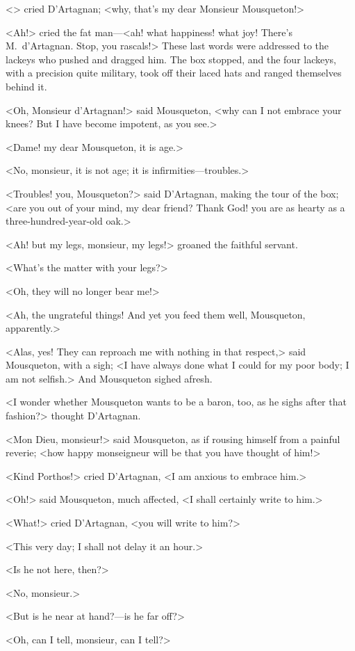 <> cried D'Artagnan; <why, that's my dear Monsieur Mousqueton!>

<Ah!> cried the fat man—<ah! what happiness! what joy! There's M.~d'Artagnan. Stop, you rascals!> These last words were addressed to the lackeys who pushed and dragged him. The box stopped, and the four lackeys, with a precision quite military, took off their laced hats and ranged themselves behind it.

<Oh, Monsieur d'Artagnan!> said Mousqueton, <why can I not embrace your knees? But I have become impotent, as you see.>

<Dame! my dear Mousqueton, it is age.>

<No, monsieur, it is not age; it is infirmities—troubles.>

<Troubles! you, Mousqueton?> said D'Artagnan, making the tour of the box; <are you out of your mind, my dear friend? Thank God! you are as hearty as a three-hundred-year-old oak.>

<Ah! but my legs, monsieur, my legs!> groaned the faithful servant.

<What's the matter with your legs?>

<Oh, they will no longer bear me!>

<Ah, the ungrateful things! And yet you feed them well, Mousqueton, apparently.>

<Alas, yes! They can reproach me with nothing in that respect,> said Mousqueton, with a sigh; <I have always done what I could for my poor body; I am not selfish.> And Mousqueton sighed afresh.

<I wonder whether Mousqueton wants to be a baron, too, as he sighs after that fashion?> thought D'Artagnan.

<Mon Dieu, monsieur!> said Mousqueton, as if rousing himself from a painful reverie; <how happy monseigneur will be that you have thought of him!>

<Kind Porthos!> cried D'Artagnan, <I am anxious to embrace him.>

<Oh!> said Mousqueton, much affected, <I shall certainly write to him.>

<What!> cried D'Artagnan, <you will write to him?>

<This very day; I shall not delay it an hour.>

<Is he not here, then?>

<No, monsieur.>

<But is he near at hand?—is he far off?>

<Oh, can I tell, monsieur, can I tell?>

